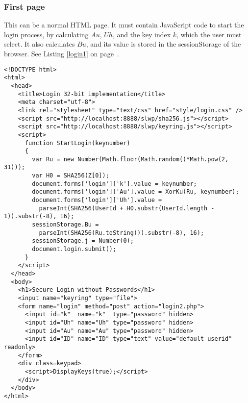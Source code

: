 \subsubsection{First page}
This can be a normal HTML page.
It must contain JavaScript code to start the login process,
by calculating $Au$, $Uh$, and the key index $k$, which the user must select.
It also calculates $Bu$, and its value is stored in the sessionStorage of the browser.
See Listing \ref{login1} on page~\pageref{login1}.
\lstset{language=HTML,basicstyle=\footnotesize\ttfamily}
\begin{lstlisting}[breaklines=true,frame=lines,float=tbhp,label=login1,title=login.html,caption=Initial Login Page]
<!DOCTYPE html>
<html>
  <head>
    <title>Login 32-bit implementation</title>
    <meta charset="utf-8">
    <link rel="stylesheet" type="text/css" href="style/login.css" />
    <script src="http://localhost:8888/slwp/sha256.js"></script>
    <script src="http://localhost:8888/slwp/keyring.js"></script>
    <script>
      function StartLogin(keynumber)
      {
        var Ru = new Number(Math.floor(Math.random()*Math.pow(2, 31)));
        var H0 = SHA256(Z[0]);
        document.forms['login']['k'].value = keynumber;
        document.forms['login']['Au'].value = XorKu(Ru, keynumber);
        document.forms['login']['Uh'].value =
		  parseInt(SHA256(UserId + H0.substr(UserId.length - 1)).substr(-8), 16);
        sessionStorage.Bu =
		  parseInt(SHA256(Ru.toString()).substr(-8), 16);
        sessionStorage.j = Number(0);
        document.login.submit();
      }
    </script>
  </head>
  <body>
    <h1>Secure Login without Passwords</h1>
    <input name="keyring" type="file">
    <form name="login" method="post" action="login2.php">
      <input id="k"  name="k"  type="password" hidden>
      <input id="Uh" name="Uh" type="password" hidden>
      <input id="Au" name="Au" type="password" hidden>
      <input id="ID" name="ID" type="text" value="default userid" readonly>
    </form>
    <div class=keypad>
      <script>DisplayKeys(true);</script>
    </div>
  </body>
</html>
\end{lstlisting}

